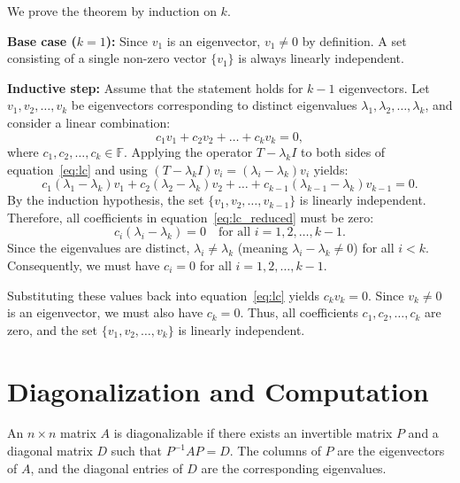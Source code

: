 \documentclass[10pt, letterpaper]{article}
\renewenvironment{proof}[1][\proofname]{%
  \begin{proofbox}{#1}%
}{%
  \end{proofbox}%
}
\begin{document}
\begin{proof}
    We prove the theorem by induction on $k$.
    
    \textbf{Base case ($k=1$):} Since $v_1$ is an eigenvector, $v_1 \neq 0$ by definition. A set consisting of a single non-zero vector $\{v_1\}$ is always linearly independent.
    
    \textbf{Inductive step:} Assume that the statement holds for $k - 1$ eigenvectors. Let $v_1, v_2, \dots, v_k$ be eigenvectors corresponding to distinct eigenvalues $\lambda_1, \lambda_2, \dots, \lambda_k$, and consider a linear combination:
    \begin{equation}\label{eq:lc}
        c_1 v_1 + c_2 v_2 + \dots + c_k v_k = 0,
    \end{equation}
    where $c_1, c_2, \dots, c_k \in \mathbb{F}$. Applying the operator $T - \lambda_k I$ to both sides of equation~\eqref{eq:lc} and using $(T - \lambda_k I)v_i = (\lambda_i - \lambda_k)v_i$ yields:
    \begin{equation}\label{eq:lc_reduced}
        c_1 (\lambda_1 - \lambda_k) v_1 + c_2 (\lambda_2 - \lambda_k) v_2 + \dots + c_{k-1} (\lambda_{k-1} - \lambda_k) v_{k-1} = 0.
    \end{equation}
    By the induction hypothesis, the set $\{v_1, v_2, \dots, v_{k-1}\}$ is linearly independent. Therefore, all coefficients in equation~\eqref{eq:lc_reduced} must be zero:
    \begin{equation*}
        c_i (\lambda_i - \lambda_k) = 0 \quad \text{for all } i = 1, 2, \dots, k-1.
    \end{equation*}
    Since the eigenvalues are distinct, $\lambda_i \neq \lambda_k$ (meaning $\lambda_i - \lambda_k \neq 0$) for all $i < k$. Consequently, we must have $c_i = 0$ for all $i = 1, 2, \dots, k-1$.
    
    Substituting these values back into equation~\eqref{eq:lc} yields $c_k v_k = 0$. Since $v_k \neq 0$ is an eigenvector, we must also have $c_k = 0$. Thus, all coefficients $c_1, c_2, \dots, c_k$ are zero, and the set $\{v_1, v_2, \dots, v_k\}$ is linearly independent.
\end{proof}

\section{Diagonalization and Computation}
An $n \times n$ matrix $A$ is diagonalizable if there exists an invertible matrix $P$ and a diagonal matrix $D$ such that $P^{-1} A P = D$. The columns of $P$ are the eigenvectors of $A$, and the diagonal entries of $D$ are the corresponding eigenvalues.
\end{document}
